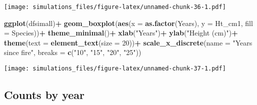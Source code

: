 \documentclass[]{article}
\newenvironment{Shaded}{\begin{snugshade}}{\end{snugshade}}
\newcommand{\KeywordTok}[1]{\textcolor[rgb]{0.13,0.29,0.53}{\textbf{#1}}}
\newcommand{\DataTypeTok}[1]{\textcolor[rgb]{0.13,0.29,0.53}{#1}}
\newcommand{\DecValTok}[1]{\textcolor[rgb]{0.00,0.00,0.81}{#1}}
\newcommand{\StringTok}[1]{\textcolor[rgb]{0.31,0.60,0.02}{#1}}
\newcommand{\OperatorTok}[1]{\textcolor[rgb]{0.81,0.36,0.00}{\textbf{#1}}}
\newcommand{\NormalTok}[1]{#1}
\begin{document}
\texttt{[image: simulations\_files/figure-latex/unnamed-chunk-36-1.pdf]}

\begin{Shaded}
\begin{Highlighting}[]
\KeywordTok{ggplot}\NormalTok{(dfsimall)}\OperatorTok{+}
\StringTok{  }\KeywordTok{geom_boxplot}\NormalTok{(}\KeywordTok{aes}\NormalTok{(}\DataTypeTok{x =} \KeywordTok{as.factor}\NormalTok{(Years), }\DataTypeTok{y =}\NormalTok{ Ht_cm1, }\DataTypeTok{fill =}\NormalTok{ Species))}\OperatorTok{+}
\StringTok{  }\KeywordTok{theme_minimal}\NormalTok{()}\OperatorTok{+}
\StringTok{  }\KeywordTok{xlab}\NormalTok{(}\StringTok{"Years"}\NormalTok{)}\OperatorTok{+}
\StringTok{  }\KeywordTok{ylab}\NormalTok{(}\StringTok{"Height (cm)"}\NormalTok{)}\OperatorTok{+}
\StringTok{  }\KeywordTok{theme}\NormalTok{(}\DataTypeTok{text =} \KeywordTok{element_text}\NormalTok{(}\DataTypeTok{size =} \DecValTok{20}\NormalTok{))}\OperatorTok{+}
\StringTok{  }\KeywordTok{scale_x_discrete}\NormalTok{(}\DataTypeTok{name =} \StringTok{"Years since fire"}\NormalTok{, }\DataTypeTok{breaks =} \KeywordTok{c}\NormalTok{(}\StringTok{"10"}\NormalTok{, }\StringTok{"15"}\NormalTok{, }\StringTok{"20"}\NormalTok{, }\StringTok{"25"}\NormalTok{))}
\end{Highlighting}
\end{Shaded}

\texttt{[image: simulations\_files/figure-latex/unnamed-chunk-37-1.pdf]}

\subsection{Counts by year}\label{counts-by-year}

\begin{Shaded}
\end{Shaded}
\end{document}
